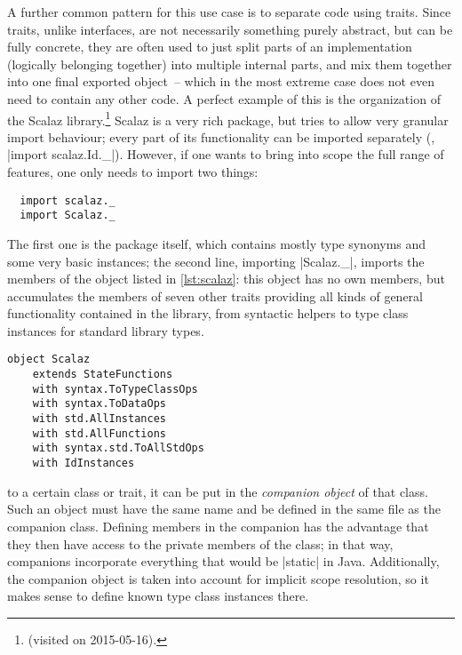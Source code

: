 A further common pattern for this use case is to separate code using traits. Since traits, unlike
interfaces, are not necessarily something purely abstract, but can be fully concrete, they are often
used to just split parts of an implementation (logically belonging together) into multiple internal
parts, and mix them together into one final exported object~-- which in the most extreme case does
not even need to contain any other code. A perfect example of this is the organization of the Scalaz
library.\footnote{\protect{}
  (visited on 2015-05-16).} Scalaz is a very rich package, but tries to allow very granular import
behaviour; every part of its functionality can be imported separately (\eg, %
|import scalaz.Id._|). However, if one wants to bring into scope the full range of features, one
only needs to import two things:
\begin{lstlisting}
  import scalaz._
  import Scalaz._
\end{lstlisting}
The first one is the package itself, which contains mostly type synonyms and some very basic
instances; the second line, importing |Scalaz._|, imports the members of the object listed in
\autoref{lst:scalaz}: this object has no own members, but accumulates the members of seven other
traits providing all kinds of general functionality contained in the library, from syntactic helpers
to type class instances for standard library types.

\begin{lstlisting}[style=floating, label=lst:scalaz, 
  caption={The definition of the \texttt{Scalaz} object (defined in file
    \protect\href{https://github.com/scalaz/scalaz/blob/f7256ad19bf2bf92756d2c3168ed643aad07d356/core/src/main/scala/scalaz/Scalaz.scala}{\nolinkurl{scalaz/core/src/main/scala/scalaz/Scalaz.scala}}),
    collecting functionality from a range of implementation traits.}]
  object Scalaz
    extends StateFunctions        
    with syntax.ToTypeClassOps    
    with syntax.ToDataOps         
    with std.AllInstances         
    with std.AllFunctions         
    with syntax.std.ToAllStdOps   
    with IdInstances              
\end{lstlisting}

 to a certain class or trait, it can be put in the
\emph{companion object} of that class. Such an object must have the same name and be defined in the
same file as the companion class. Defining members in the companion has the advantage that they then
have access to the private members of the class; in that way, companions incorporate everything that
would be |static| in Java. Additionally, the companion object is taken into account for implicit
scope resolution, so it makes sense to define known type class instances there.

